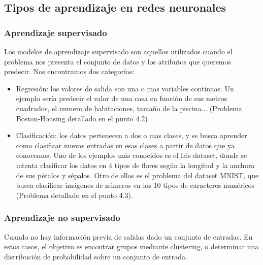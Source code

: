 \subsection{Tipos de aprendizaje en redes neuronales}
\subsubsection {Aprendizaje supervisado}
Los modelos de aprendizaje supervisado son aquellos utilizados cuando el problema nos presenta el conjunto de datos y los atributos que queremos predecir. Nos encontramos dos categorías:
\begin{itemize}
\item Regresión: los valores de salida son una o mas variables continuas. Un ejemplo sería predecir el valor de una casa en función de sus metros cuadrados, el numero de habitaciones, tamaño de la piscina... (Problema Boston-Housing detallado en el punto 4.2)
\item Clasificación: los datos pertenecen a dos o mas clases, y se busca aprender como clasificar nuevas entradas en esas clases a partir de datos que ya conocemos. Uno de los ejemplos más conocidos es el Iris dataset, donde se intenta clasificar los datos en 4 tipos de flores según la longitud y la anchura de sus pétalos y sépalos. Otro de ellos es el problema del dataset MNIST, que busca clasificar imágenes de números en los 10 tipos de caracteres numéricos (Problema detallado en el punto 4.3).
\end{itemize}
\subsubsection {Aprendizaje no supervisado}
Cuando no hay información previa de salidas dado un conjunto de entradas. En estos casos, el objetivo es encontrar grupos mediante clustering, o determinar una distribución de probabilidad sobre un conjunto de entrada.


